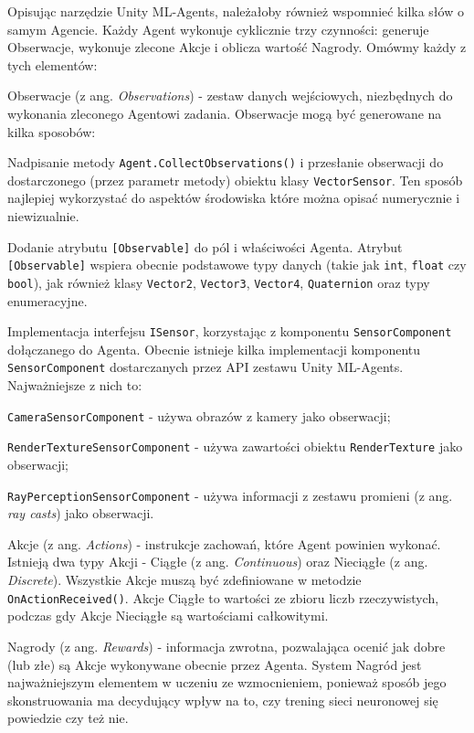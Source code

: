 Opisując narzędzie Unity ML-Agents, należałoby również wspomnieć kilka słów o samym Agencie. Każdy Agent wykonuje cyklicznie trzy czynności: generuje Obserwacje, wykonuje zlecone Akcje i oblicza wartość Nagrody. Omówmy każdy z tych elementów:
\begin{enumerate*}
\item Obserwacje (z ang. \textit{Observations}) - zestaw danych wejściowych, niezbędnych do wykonania zleconego Agentowi zadania. Obserwacje mogą być generowane na kilka sposobów:
\begin{itemize*}
\item Nadpisanie metody \texttt{Agent.CollectObservations()} i przesłanie obserwacji do dostarczonego (przez parametr metody) obiektu klasy \texttt{VectorSensor}. Ten sposób najlepiej wykorzystać do aspektów środowiska które można opisać numerycznie i niewizualnie.
\item Dodanie atrybutu \texttt{[Observable]} do pól i właściwości Agenta. Atrybut \texttt{[Observable]} wspiera obecnie podstawowe typy danych (takie jak  \texttt{int}, \texttt{float} czy \texttt{bool}), jak również klasy \texttt{Vector2}, \texttt{Vector3}, \texttt{Vector4}, \texttt{Quaternion} oraz typy enumeracyjne.
\item Implementacja interfejsu \texttt{ISensor}, korzystając z komponentu \texttt{SensorComponent} dołączanego do Agenta. Obecnie istnieje kilka implementacji komponentu \texttt{SensorComponent} dostarczanych przez API zestawu Unity ML-Agents. Najważniejsze z nich to:
\begin{itemize*}
\item \texttt{CameraSensorComponent} - używa obrazów z kamery jako obserwacji;
\item \texttt{RenderTextureSensorComponent} - używa zawartości obiektu \texttt{RenderTexture} \cite{unity:renderTexture} jako obserwacji;
\item \texttt{RayPerceptionSensorComponent} - używa informacji z zestawu promieni (z ang. \textit{ray casts}) jako obserwacji.
\end{itemize*}
\end{itemize*}
\item Akcje (z ang. \textit{Actions}) - instrukcje zachowań, które Agent powinien wykonać. Istnieją dwa typy Akcji - Ciągłe (z ang. \textit{Continuous}) oraz Nieciągłe (z ang. \textit{Discrete}). Wszystkie Akcje muszą być zdefiniowane w metodzie \texttt{OnActionReceived()}. Akcje Ciągłe to wartości ze zbioru liczb rzeczywistych, podczas gdy Akcje Nieciągłe są wartościami całkowitymi.
\item Nagrody (z ang. \textit{Rewards}) - informacja zwrotna, pozwalająca ocenić jak dobre (lub złe) są Akcje wykonywane obecnie przez Agenta. System Nagród jest najważniejszym elementem w uczeniu ze wzmocnieniem, ponieważ sposób jego skonstruowania ma decydujący wpływ na to, czy trening sieci neuronowej się powiedzie czy też nie.
\end{enumerate*}

